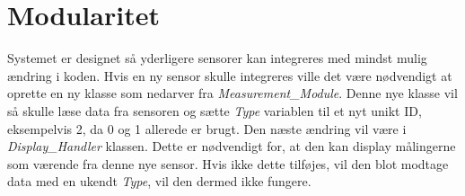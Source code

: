 \section{Modularitet}
Systemet er designet så yderligere sensorer kan integreres med mindst mulig ændring i koden. Hvis en ny sensor skulle integreres ville det være nødvendigt at oprette en ny klasse som nedarver fra \textit{Measurement\_Module}. Denne nye klasse vil så skulle læse data fra sensoren og sætte \textit{Type} variablen til et nyt unikt ID, eksempelvis 2, da 0 og 1 allerede er brugt. Den næste ændring vil være i \textit{Display\_Handler} klassen. Dette er nødvendigt for, at den kan display målingerne som værende fra denne nye sensor. Hvis ikke dette tilføjes, vil den blot modtage data med en ukendt \textit{Type}, vil den dermed ikke fungere.
